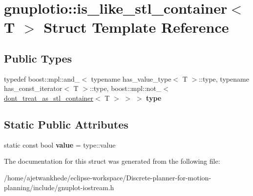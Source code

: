 \hypertarget{structgnuplotio_1_1is__like__stl__container}{}\section{gnuplotio\+:\+:is\+\_\+like\+\_\+stl\+\_\+container$<$ T $>$ Struct Template Reference}
\label{structgnuplotio_1_1is__like__stl__container}
\subsection*{Public Types}
\begin{DoxyCompactItemize}
\item 
\mbox{\label{structgnuplotio_1_1is__like__stl__container_ade67d7460534fc5556e43211baa3e3d9}} 
typedef boost\+::mpl\+::and\+\_\+$<$ typename has\+\_\+value\+\_\+type$<$ T $>$\+::type, typename has\+\_\+const\+\_\+iterator$<$ T $>$\+::type, boost\+::mpl\+::not\+\_\+$<$ \mbox{\hyperlink{structgnuplotio_1_1dont__treat__as__stl__container}{dont\+\_\+treat\+\_\+as\+\_\+stl\+\_\+container}}$<$ T $>$ $>$ $>$ {\bfseries type}
\end{DoxyCompactItemize}
\subsection*{Static Public Attributes}
\begin{DoxyCompactItemize}
\item 
\mbox{\label{structgnuplotio_1_1is__like__stl__container_ae4761e6e807deed732e41118c785c8a4}} 
static const bool {\bfseries value} = type\+::value
\end{DoxyCompactItemize}


The documentation for this struct was generated from the following file\+:\begin{DoxyCompactItemize}
\item 
/home/ajetwankhede/eclipse-\/workspace/\+Discrete-\/planner-\/for-\/motion-\/planning/include/gnuplot-\/iostream.\+h\end{DoxyCompactItemize}
